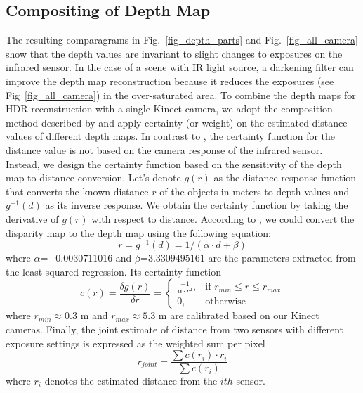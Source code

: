 \subsection{Compositing of Depth Map}
The resulting comparagrams in Fig.~\ref{fig_depth_parts} and Fig.~\ref{fig_all_camera} show that the depth values are invariant to slight changes to exposures on the infrared sensor. In the case of a scene with IR light source, a darkening filter can improve the depth map reconstruction because it reduces the exposures (see Fig~\ref{fig_all_camera}) in the over-saturated area. To combine the depth maps for HDR reconstruction with a single Kinect camera, we adopt the composition method described by \cite{mann1994beingundigital} and apply certainty (or weight) on the estimated distance values of different depth maps. In contrast to \cite{mann1994beingundigital}, the certainty function for the distance value is not based on the camera response of the infrared sensor. Instead, we design the certainty function based on the sensitivity of the depth map to distance conversion. Let's denote $g(r)$ as the distance response function that converts the known distance $r$ of the objects in meters to depth values and $g^{-1}(d)$ as its inverse response. We obtain the certainty function by taking the derivative of $g(r)$ with respect to distance. According to \cite{mann2011blind}, we could convert the disparity map to the depth map using the following equation:
\begin{equation}
r = g^{-1}(d) = 1/(\alpha \cdot d + \beta)
\end{equation} 
where $\alpha$=$-0.0030711016$ and $\beta$=$3.3309495161$ are the parameters extracted from the least squared regression. Its certainty function \begin{equation}
c(r) = \frac{\delta g(r)}{\delta r} = 
\begin{cases} \frac{-1}{\alpha \cdot r^2}, 
			& \mbox{if } r_{min} \le r \le r_{max} \\
			0, & \mbox{otherwise}
 \end{cases}
\end{equation}
where $r_{min}$$\approx$$0.3$ m and $r_{max}$$\approx$$5.3$ m are calibrated based on our Kinect cameras.
Finally, the joint estimate of distance from two sensors with different exposure settings is expressed as the weighted sum per pixel
\begin{equation}
r_{joint} = \frac{\sum c(r_i) \cdot r_i}{\sum c(r_i)}
\label{eq_depth_sum}
\end{equation}
where $r_i$ denotes the estimated distance from the $ith$ sensor.
